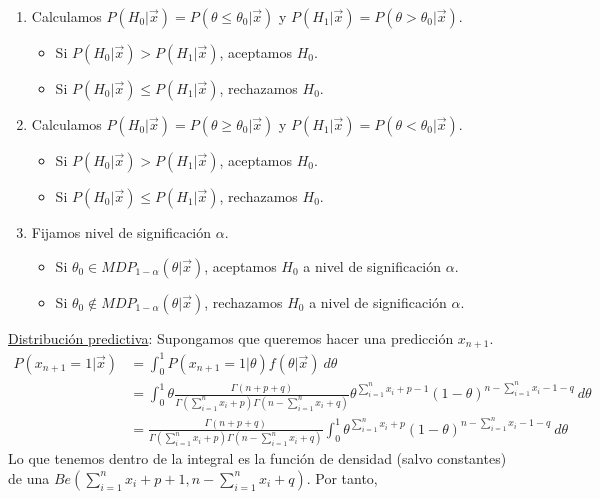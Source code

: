 \begin{enumerate}
    \item Calculamos $P(H_0 | \vec{x}) = P(\theta \leq \theta_0 |\vec{x})$ y $P(H_1 | \vec{x}) = P(\theta > \theta_0 | \vec{x})$.
    \begin{itemize}
        \item Si $P(H_0 | \vec{x}) > P(H_1 | \vec{x})$, aceptamos $H_0$.
        \item Si $P(H_0 | \vec{x}) \leq P(H_1 | \vec{x})$, rechazamos $H_0$.
    \end{itemize}
        \item Calculamos $P(H_0 | \vec{x}) = P(\theta \ge \theta_0 |\vec{x})$ y $P(H_1 | \vec{x}) = P(\theta < \theta_0 | \vec{x})$.
    \begin{itemize}
        \item Si $P(H_0 | \vec{x}) > P(H_1 | \vec{x})$, aceptamos $H_0$.
        \item Si $P(H_0 | \vec{x}) \leq P(H_1 | \vec{x})$, rechazamos $H_0$.
    \end{itemize}
    \item Fijamos nivel de significación $\alpha$.
    \begin{itemize}
        \item Si $\theta_0 \in MDP_{1 - \alpha}(\theta | \vec{x})$, aceptamos $H_0$ a nivel de significación $\alpha$.
        \item Si $\theta_0 \not\in MDP_{1 - \alpha}(\theta | \vec{x})$, rechazamos $H_0$ a nivel de significación $\alpha$.
    \end{itemize}
\end{enumerate}
\noindent \underline{Distribución predictiva}: Supongamos que queremos hacer una predicción $x_{n+1}$.
\begin{align*}
    P(x_{n+1} = 1 | \vec{x}) &= \int_{0}^{1} P(x_{n+1} = 1 | \theta) f(\theta | \vec{x}) \ d\theta \\
    &= \int_{0}^{1} \theta \frac{\Gamma(n+p+q)}{\Gamma(\sum_{i=1}^{n} x_i + p)\Gamma(n-\sum_{i=1}^{n} x_i +q)} \theta^{\sum_{i=1}^{n} x_i + p - 1} (1 - \theta)^{n - \sum_{i=1}^{n} x_i - 1 - q} \ d\theta \\
    &= \frac{\Gamma(n+p+q)}{\Gamma(\sum_{i=1}^{n} x_i + p)\Gamma(n-\sum_{i=1}^{n} x_i +q)} \int_{0}^{1} \theta^{\sum_{i=1}^{n} x_i + p} (1 - \theta)^{n - \sum_{i=1}^{n} x_i - 1 - q} \ d\theta 
\end{align*}
Lo que tenemos dentro de la integral es la función de densidad (salvo constantes) de una \newline $Be\left( \sum_{i=1}^{n} x_i + p + 1, n - \sum_{i=1}^{n} x_i + q \right)$. Por tanto, 
